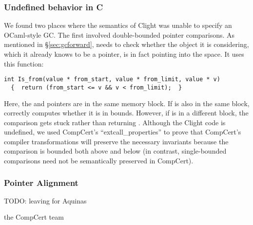\subsubsection*{Undefined behavior in C} %
We found two places where the semantics of Clight was unable to specify an OCaml-style GC.
The first involved double-bounded pointer comparisons.
As mentioned in \S\ref{sec:gcforward},  needs to
check whether the object it is considering, which it already knows to be a pointer,
is in fact pointing into the  space. It uses this function:
\begin{lstlisting}[numbers=none]
  int Is_from(value * from_start, value * from_limit, value * v)
  {  return (from_start <= v && v < from_limit);  }
\end{lstlisting}
Here, the  and  pointers are in the same
memory block. If  is also in the same block, 
correctly computes whether it is in bounds.
However, if  is in a different block, the comparison gets stuck rather than 
returning .
Although the Clight code is undefined, we used CompCert's ``extcall{\_}properties''
to prove that CompCert's compiler transformations will preserve the necessary invariants
because the comparison is bounded both above and below (in contrast, single-bounded 
comparisons need not be semantically preserved in CompCert).

\subsubsection*{Pointer Alignment}
{\color{red}TODO: leaving for Aquinas}

the CompCert team \cite{leroy_email}
